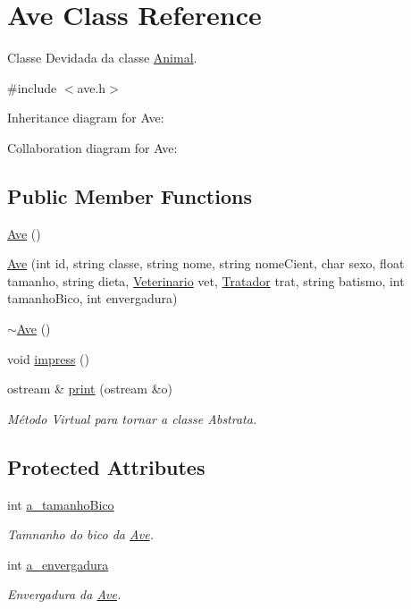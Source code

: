 \hypertarget{classAve}{}\section{Ave Class Reference}
\label{classAve}


Classe Devidada da classe \hyperlink{classAnimal}{Animal}.  




{\ttfamily \#include $<$ave.\+h$>$}



Inheritance diagram for Ave\+:


Collaboration diagram for Ave\+:
\subsection*{Public Member Functions}
\begin{DoxyCompactItemize}
\item 
\hyperlink{classAve_a31bc97c3258df566381300c8b9abc73a}{Ave} ()
\item 
\hyperlink{classAve_ae326939ff66b9771ffb387e28aecb7d8}{Ave} (int id, string classe, string nome, string nome\+Cient, char sexo, float tamanho, string dieta, \hyperlink{classVeterinario}{Veterinario} vet, \hyperlink{classTratador}{Tratador} trat, string batismo, int tamanho\+Bico, int envergadura)
\item 
\hyperlink{classAve_ad290be8d6fb95f1cfd24b5f55def7741}{$\sim$\+Ave} ()
\item 
void \hyperlink{classAve_a047ce9b9f688db5a9faa24e0eb70aad9}{impress} ()
\item 
ostream \& \hyperlink{classAve_abd32f1bfb45910f66aebeba26d231bba}{print} (ostream \&o)
\begin{DoxyCompactList}\small\item\em Método Virtual para tornar a classe Abstrata. \end{DoxyCompactList}\end{DoxyCompactItemize}
\subsection*{Protected Attributes}
\begin{DoxyCompactItemize}
\item 
int \hyperlink{classAve_a4f544837b737e0a7984843033531f59f}{a\+\_\+tamanho\+Bico}
\begin{DoxyCompactList}\small\item\em Tamnanho do bico da \hyperlink{classAve}{Ave}. \end{DoxyCompactList}\item 
int \hyperlink{classAve_a755ef11f9c9bd778999b84856f42207d}{a\+\_\+envergadura}
\begin{DoxyCompactList}\small\item\em Envergadura da \hyperlink{classAve}{Ave}. \end{DoxyCompactList}\end{DoxyCompactItemize}


